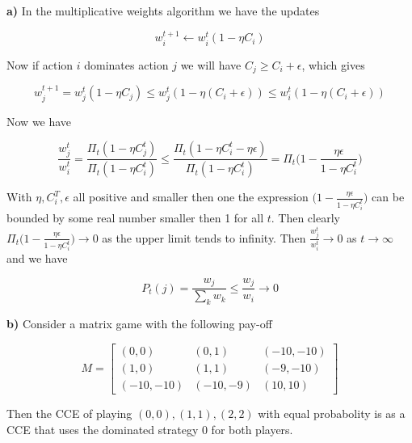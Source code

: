 \textbf{a)} In the multiplicative weights algorithm we have the updates

$$
w_i^{t+1} \leftarrow w_i^t (1- \eta C_i)
$$

Now if action $i$ dominates action $j$ we will have $C_j \ge C_i + \epsilon$, which gives

$$
w_j^{t+1} =  w_j^t (1- \eta C_j) \le w_j^t (1- \eta (C_i + \epsilon)) \le w_i^t (1- \eta (C_i + \epsilon))
$$

Now we have

$$
\frac{w_j^t}{w_i^t} = \frac{ \Pi_t (1- \eta C_j^t)}{\Pi_t (1- \eta C_i^t)} \le \frac{ \Pi_t (1- \eta C_i^t - \eta \epsilon)}{\Pi_t (1- \eta C_i^t)} = \Pi_t \bigg(1- \frac{\eta \epsilon}{1- \eta C_i^t} \bigg)
$$

With $\eta, C_i^T, \epsilon$ all positive and smaller then one the expression $\big(1- \frac{\eta \epsilon}{1- \eta C_i^t} \big)$ can be bounded by some real number smaller then 1 for all $t$. Then clearly $\Pi_t \big(1- \frac{\eta \epsilon}{1- \eta C_i^t} \big) \rightarrow 0$ as the upper limit tends to infinity. Then $\frac{w_j^t}{w_i^t} \rightarrow 0$ as $t \rightarrow \infty$ and we have

$$
P_t(j) = \frac{w_j}{\sum_k w_k} \le \frac{w_j}{w_i} \rightarrow 0
$$


\textbf{b)} Consider a matrix game with the following pay-off

$$
   M=
  \left[ {\begin{array}{cc}
   (0,0) & (0,1) & (-10,-10) \\ (1,0) & (1,1) & (-9,-10) \\ (-10,-10) & (-10,-9) & (10,10) \end{array} } \right]
$$


Then the CCE of playing $(0,0), (1,1), (2,2)$ with equal probabolity is as a CCE that uses the dominated strategy $0$ for both players.


